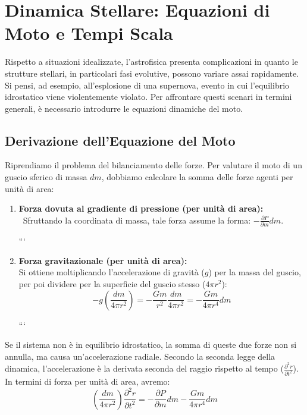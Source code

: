 \section{Dinamica Stellare: Equazioni di Moto e Tempi Scala}

Rispetto a situazioni idealizzate, l'astrofisica presenta complicazioni in quanto le strutture stellari, in particolari fasi evolutive, possono variare assai rapidamente. Si pensi, ad esempio, all'esplosione di una supernova, evento in cui l'equilibrio idrostatico viene violentemente violato. Per affrontare questi scenari in termini generali, è necessario introdurre le equazioni dinamiche del moto.

\subsection{Derivazione dell'Equazione del Moto}

Riprendiamo il problema del bilanciamento delle forze. Per valutare il moto di un guscio sferico di massa $dm$, dobbiamo calcolare la somma delle forze agenti per unità di area:
\begin{enumerate}
\item \textbf{Forza dovuta al gradiente di pressione (per unità di area):} \
Sfruttando la coordinata di massa, tale forza assume la forma: $- \frac{\partial P}{\partial m} dm$.

```
\item \textbf{Forza gravitazionale (per unità di area):} \\
Si ottiene moltiplicando l'accelerazione di gravità ($g$) per la massa del guscio, per poi dividere per la superficie del guscio stesso ($4\pi r^2$):
\begin{equation}
    - g \left( \frac{dm}{4\pi r^2} \right) = - \frac{G m}{r^2} \frac{dm}{4\pi r^2} = - \frac{G m}{4\pi r^4} dm
\end{equation}

```

\end{enumerate}

Se il sistema non è in equilibrio idrostatico, la somma di queste due forze non si annulla, ma causa un'accelerazione radiale. Secondo la seconda legge della dinamica, l'accelerazione è la derivata seconda del raggio rispetto al tempo ($\frac{\partial^2 r}{\partial t^2}$).
In termini di forza per unità di area, avremo:
\begin{equation}
\left(\frac{dm}{4\pi r^2}\right) \frac{\partial^2 r}{\partial t^2} = - \frac{\partial P}{\partial m} dm - \frac{G m}{4\pi r^4} dm
\end{equation}

